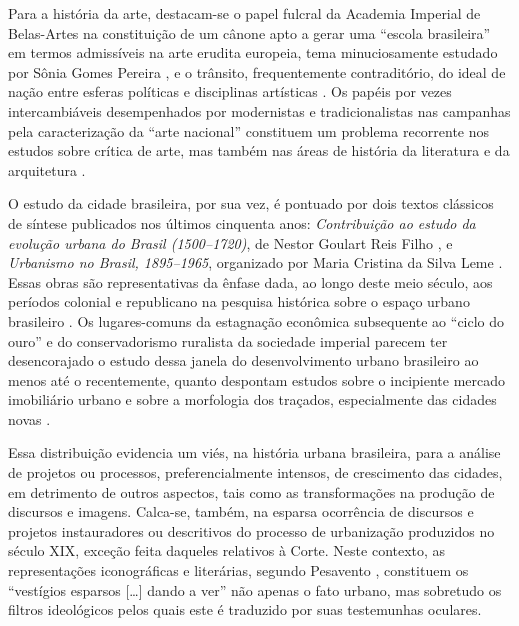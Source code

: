 Para a história da arte, destacam-se o papel fulcral da Academia
Imperial de Belas-Artes na constituição de um cânone apto a gerar uma
``escola brasileira'' em termos admissíveis na arte erudita europeia,
tema minuciosamente estudado por Sônia Gomes Pereira
\autocite*{pereira:2012revisao}, e o trânsito, frequentemente
contraditório, do ideal de nação entre esferas políticas e disciplinas
artísticas \autocite{abreu:2001museu}. Os papéis por vezes
intercambiáveis desempenhados por modernistas e tradicionalistas nas
campanhas pela caracterização da ``arte nacional'' constituem um
problema recorrente nos estudos sobre crítica de arte, mas também nas
áreas de história da literatura e da arquitetura
\autocite{lins:1996gonzaga25,thiengo:2010questao,wisnik:2007plastica}.

O estudo da cidade brasileira, por sua vez, é pontuado por dois textos
clássicos de síntese publicados nos últimos cinquenta anos:
\emph{Contribuição ao estudo da evolução urbana do Brasil (1500--1720)},
de Nestor Goulart Reis Filho \autocite*{reisfilho:1968contribuicao}, e
\emph{Urbanismo no Brasil, 1895--1965}, organizado por Maria Cristina da
Silva Leme \autocite*{leme:2005urbanismo}. Essas obras são
representativas da ênfase dada, ao longo deste meio século, aos períodos
colonial e republicano na pesquisa histórica sobre o espaço urbano
brasileiro \autocite{fernandes:2004historia}. Os lugares-comuns da
estagnação econômica subsequente ao ``ciclo do ouro'' e do
conservadorismo ruralista da sociedade imperial parecem ter
desencorajado o estudo dessa janela do desenvolvimento urbano brasileiro
ao menos até o recentemente, quanto despontam estudos sobre o incipiente
mercado imobiliário urbano \autocite{bueno:2005tecido} e sobre a
morfologia dos traçados, especialmente das cidades novas
\autocite{brazesilva:2012planejamento13,nogueira:2013analise}.

Essa distribuição evidencia um viés, na história urbana brasileira, para
a análise de projetos ou processos, preferencialmente intensos, de
crescimento das cidades, em detrimento de outros aspectos, tais como as
transformações na produção de discursos e imagens. Calca-se, também, na
esparsa ocorrência de discursos e projetos instauradores ou descritivos
do processo de urbanização produzidos no século XIX, exceção feita
daqueles relativos à Corte. Neste contexto, as representações
iconográficas e literárias, segundo Pesavento
\autocite*[p.~665]{pesavento:2001busca}, constituem os ``vestígios
esparsos {[}\ldots{]} dando a ver'' não apenas o fato urbano, mas
sobretudo os filtros ideológicos pelos quais este é traduzido por suas
testemunhas oculares.


